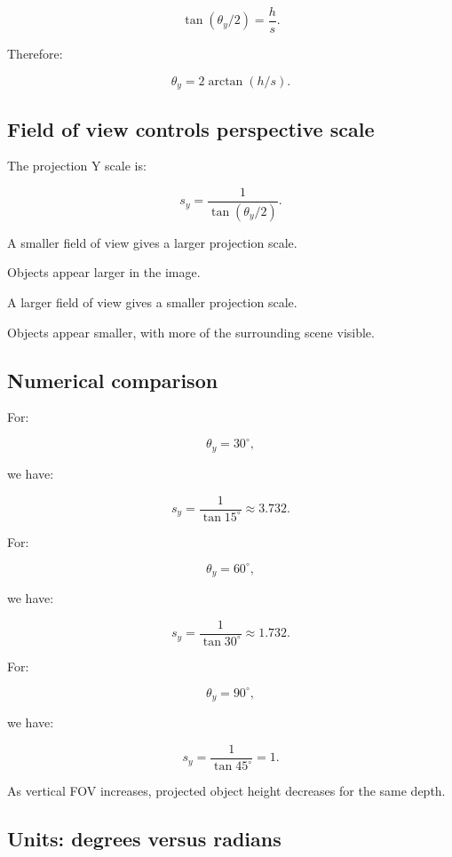 \[
 \boxed{ \tan(\theta_y/2)=\frac hs }.
\]

Therefore:

\[
 \boxed{ \theta_y=2\arctan(h/s) }.
\]

\subsection{Field of view controls perspective scale}\label{02-foundations-ii-ch033-field-of-view-controls-perspective-scale}

\hypertarget{02-foundations-ii-ch033-field-of-view-controls-perspective-scale}{}

The projection Y scale is:

\[
 \boxed{ s_y=\frac1{\tan(\theta_y/2)} }.
\]

A smaller field of view gives a larger projection scale.

Objects appear larger in the image.

A larger field of view gives a smaller projection scale.

Objects appear smaller, with more of the surrounding scene visible.

\subsection{Numerical comparison}\label{02-foundations-ii-ch033-numerical-comparison}

\hypertarget{02-foundations-ii-ch033-numerical-comparison}{}

For:

\[
 \theta_y=30^\circ,
\]

we have:

\[
 s_y=\frac1{\tan15^\circ}\approx3.732.
\]

For:

\[
 \theta_y=60^\circ,
\]

we have:

\[
 s_y=\frac1{\tan30^\circ}\approx1.732.
\]

For:

\[
 \theta_y=90^\circ,
\]

we have:

\[
 s_y=\frac1{\tan45^\circ}=1.
\]

As vertical FOV increases, projected object height decreases for the same depth.

\subsection{Units: degrees versus radians}\label{02-foundations-ii-ch033-units-degrees-versus-radians}

